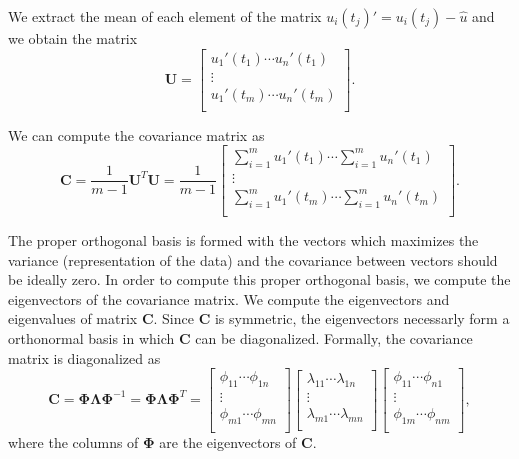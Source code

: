 \documentclass{article}
\begin{document}
We extract the mean of each element of the matrix $u_i(t_j)' = u_i(t_j) - \hat{u}$ and 
we obtain the matrix 
\begin{equation}
  \bm{U} =
  \begin{bmatrix}
      u_1'(t_1) \cdots u_n'(t_1)\\
      \vdots\\
      u_1'(t_m) \cdots u_n'(t_m)\\
    \end{bmatrix} 
    .
\end{equation}

We can compute the covariance matrix as 
\begin{equation}
  \bm{C} = \frac{1}{m-1}\bm{U}^T\bm{U} = \frac{1}{m-1}
  \begin{bmatrix}
      \sum_{i=1}^{m} u_1'(t_1) \cdots \sum_{i=1}^{m} u_n'(t_1)\\
      \vdots\\
      \sum_{i=1}^{m} u_1'(t_m) \cdots \sum_{i=1}^{m} u_n'(t_m)\\
    \end{bmatrix} 
    .
\end{equation}

The proper orthogonal basis is formed with the vectors which maximizes the variance (representation of the data) and the covariance between vectors 
should be ideally zero. In order to compute this proper orthogonal basis, we compute the eigenvectors of the covariance matrix. \newline
We compute the eigenvectors and eigenvalues of matrix $\bm{C}$. Since $\bm{C}$ is symmetric,
the eigenvectors necessarly form a orthonormal basis in which $\bm{C}$ can be diagonalized. 
Formally, the covariance matrix is diagonalized as 
\begin{equation}
  \bm{C} = \bm{\Phi}\bm{\Lambda}\bm{\Phi}^{-1} = \bm{\Phi}\bm{\Lambda}\bm{\Phi}^T =
  \begin{bmatrix}
    \phi_{11} \cdots \phi_{1n}\\
    \vdots\\
    \phi_{m1} \cdots \phi_{mn}\\
  \end{bmatrix} 
    \begin{bmatrix}
    \lambda_{11} \cdots \lambda_{1n}\\
    \vdots\\
    \lambda_{m1} \cdots \lambda_{mn}\\
  \end{bmatrix} 
  \begin{bmatrix}
    \phi_{11} \cdots \phi_{n1}\\
    \vdots\\
    \phi_{1m} \cdots \phi_{nm}\\
  \end{bmatrix} 
  ,
\end{equation}
where the columns of $\bm{\Phi}$ are the eigenvectors of $\bm{C}$.\newline
\end{document}
